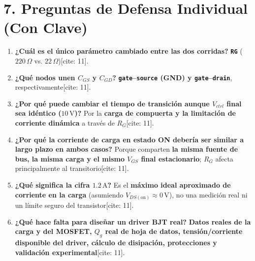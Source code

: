 \documentclass[11pt, a4paper]{article}
\begin{document}
\section*{7. Preguntas de Defensa Individual (Con Clave)}
\begin{enumerate}[noitemsep]
    \item \textbf{¿Cuál es el único parámetro cambiado entre las dos corridas?} \textbf{\texttt{RG}} ($220\,\Omega$ vs. $22\,\Omega$)[cite: 11].
    \item \textbf{¿Qué nodos unen $C_{GS}$ y $C_{GD}$?} \textbf{\texttt{gate}--\texttt{source} (GND) y \texttt{gate}--\texttt{drain}}, respectivamente[cite: 11].
    \item \textbf{¿Por qué puede cambiar el tiempo de transición aunque $V_{ctrl}$ final sea idéntico ($10\,\text{V}$)?} Por la \textbf{carga de compuerta y la limitación de corriente dinámica} a través de $R_G$[cite: 11].
    \item \textbf{¿Por qué la corriente de carga en estado ON debería ser similar a largo plazo en ambos casos?} Porque comparten \textbf{la misma fuente de bus, la misma carga y el mismo $V_{GS}$ final estacionario}; $R_G$ afecta principalmente al transitorio[cite: 11].
    \item \textbf{¿Qué significa la cifra $1.2\,\text{A}$?} Es el \textbf{máximo ideal aproximado de corriente en la carga} (asumiendo $V_{DS(\text{on})} \approx 0\,\text{V}$), no una medición real ni un límite seguro del transistor[cite: 11].
    \item \textbf{¿Qué hace falta para diseñar un driver BJT real?} \textbf{Datos reales de la carga y del MOSFET, $Q_g$ real de hoja de datos, tensión/corriente disponible del driver, cálculo de disipación, protecciones y validación experimental}[cite: 11].
\end{enumerate}
\end{document}
